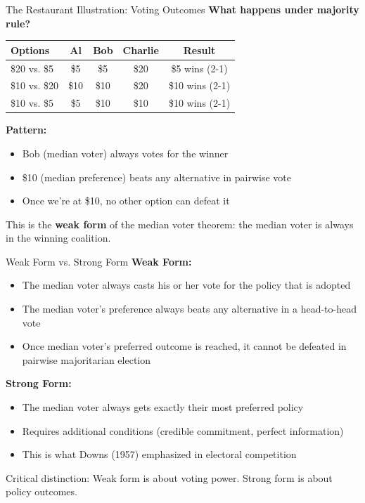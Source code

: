 \documentclass[10pt]{beamer}
\begin{document}
\begin{frame}{The Restaurant Illustration: Voting Outcomes}
\textbf{What happens under majority rule?}


\begin{table}
\centering
\begin{tabular}{lcccc}
\toprule
\textbf{Options} & \textbf{Al} & \textbf{Bob} & \textbf{Charlie} & \textbf{Result} \\
\midrule
\$20 vs. \$5 & \$5 & \$5 & \$20 & \alert{\$5 wins (2-1)} \\

\$10 vs. \$20 & \$10 & \$10 & \$20 & \alert{\$10 wins (2-1)} \\

\$10 vs. \$5 & \$5 & \$10 & \$10 & \alert{\$10 wins (2-1)} \\
\bottomrule
\end{tabular}
\end{table}



\textbf{Pattern:}
\begin{itemize}
\item Bob (median voter) \alert{always votes for the winner}
\item \$10 (median preference) \alert{beats any alternative} in pairwise vote
\item Once we're at \$10, no other option can defeat it
\end{itemize}



This is the \textbf{weak form} of the median voter theorem: the median voter is always in the winning coalition.
\end{frame}

\begin{frame}{Weak Form vs. Strong Form}
\textbf{Weak Form:}
\begin{itemize}
\item The median voter always casts his or her vote for the policy that is adopted
\item The median voter's preference always beats any alternative in a head-to-head vote
\item Once median voter's preferred outcome is reached, it cannot be defeated in pairwise majoritarian election
\end{itemize}



\textbf{Strong Form:}
\begin{itemize}
\item The median voter always gets \alert{exactly} their most preferred policy
\item Requires additional conditions (credible commitment, perfect information)
\item This is what Downs (1957) emphasized in electoral competition
\end{itemize}



\alert{Critical distinction:} Weak form is about voting power. Strong form is about policy outcomes.
\end{frame}
\end{document}
